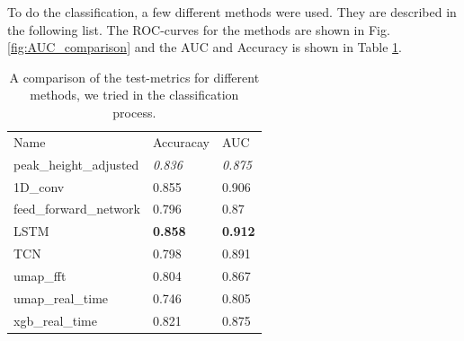 \noindent
To do the classification, a few different methods were used. They are described in the following list. The ROC-curves for the methods are shown in Fig. \ref{fig:AUC_comparison} and the AUC and Accuracy is shown in Table \ref{tab:Metric Comparison}.


\begin{table}[h]
\centering
\caption{A comparison of the test-metrics for different methods, we tried in the classification process.}
\label{tab:Metric Comparison}
\begin{tabular}{lll}
Name                   & Accuracay & AUC   \\
peak\_height\_adjusted & \textit{0.836}     & \textit{0.875} \\
1D\_conv               & 0.855     & 0.906 \\
feed\_forward\_network & 0.796     & 0.87  \\
LSTM                   & \textbf{0.858}     & \textbf{0.912} \\
TCN                    & 0.798     & 0.891 \\
umap\_fft              & 0.804     & 0.867 \\
umap\_real\_time       & 0.746     & 0.805 \\
xgb\_real\_time        & 0.821     & 0.875
\end{tabular}
\end{table}

